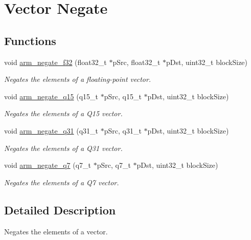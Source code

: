 \hypertarget{group__negate}{}\section{Vector Negate}
\label{group__negate}
\subsection*{Functions}
\begin{DoxyCompactItemize}
\item 
void \hyperlink{group__negate_ga2e169c4de6cc6e3ba4be9473531e6657}{arm\+\_\+negate\+\_\+f32} (float32\+\_\+t $\ast$p\+Src, float32\+\_\+t $\ast$p\+Dst, uint32\+\_\+t block\+Size)
\begin{DoxyCompactList}\small\item\em Negates the elements of a floating-\/point vector. \end{DoxyCompactList}\item 
void \hyperlink{group__negate_ga0239a833d72cf00290b9723c394e5042}{arm\+\_\+negate\+\_\+q15} (q15\+\_\+t $\ast$p\+Src, q15\+\_\+t $\ast$p\+Dst, uint32\+\_\+t block\+Size)
\begin{DoxyCompactList}\small\item\em Negates the elements of a Q15 vector. \end{DoxyCompactList}\item 
void \hyperlink{group__negate_ga2784c6887686a73dc7c364e2e41c776c}{arm\+\_\+negate\+\_\+q31} (q31\+\_\+t $\ast$p\+Src, q31\+\_\+t $\ast$p\+Dst, uint32\+\_\+t block\+Size)
\begin{DoxyCompactList}\small\item\em Negates the elements of a Q31 vector. \end{DoxyCompactList}\item 
void \hyperlink{group__negate_gaae78fc079a43bdaa3055f9b32e2a1f4c}{arm\+\_\+negate\+\_\+q7} (q7\+\_\+t $\ast$p\+Src, q7\+\_\+t $\ast$p\+Dst, uint32\+\_\+t block\+Size)
\begin{DoxyCompactList}\small\item\em Negates the elements of a Q7 vector. \end{DoxyCompactList}\end{DoxyCompactItemize}


\subsection{Detailed Description}
Negates the elements of a vector.


